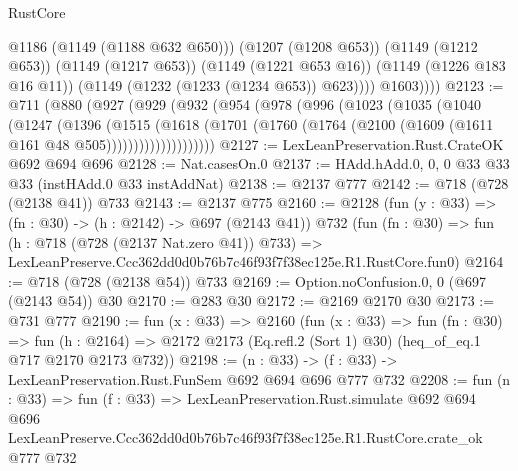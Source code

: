 \begin{lexlean}{RustCore}
\begin{coremodule}
                  @1186
                  (@1149 (@1188 @632 @650)))
                (@1207 (@1208 @653))
                (@1149 (@1212 @653))
                (@1149 (@1217 @653))
                (@1149 (@1221 @653 @16))
                (@1149 (@1226 @183 @16 @11))
                (@1149 (@1232 (@1233 (@1234 @653)) @623))))
            @1603))))
@2123 := @711
    (@880
      (@927
        (@929
          (@932
            (@954
              (@978
                (@996
                  (@1023
                    (@1035
                      (@1040
                        (@1247
                          (@1396
                            (@1515
                              (@1618
                                (@1701
                                  (@1760
                                    (@1764 (@2100 (@1609 (@1611 @161 @48 @505))))))))))))))))))))
@2127 := LexLeanPreservation.Rust.CrateOK @692 @694 @696
@2128 := Nat.casesOn.{0}
@2137 := HAdd.hAdd.{0, 0, 0} @33 @33 @33 (instHAdd.{0} @33 instAddNat)
@2138 := @2137 @777
@2142 := @718 (@728 (@2138 @41)) @733
@2143 := @2137 @775
@2160 := @2128
    (fun (y : @33) => (fn : @30) -> (h : @2142) -> @697 (@2143 @41))
    @732
    (fun (fn : @30) =>
    fun (h : @718 (@728 (@2137 Nat.zero @41)) @733) =>
    LexLeanPreserve.Ccc362dd0d0b76b7c46f93f7f38ec125e.R1.RustCore.fun0)
@2164 := @718 (@728 (@2138 @54)) @733
@2169 := Option.noConfusion.{0, 0} (@697 (@2143 @54)) @30
@2170 := @283 @30
@2172 := @2169 @2170 @30
@2173 := @731 @777
@2190 := fun (x : @33) =>
  @2160
    (fun (x : @33) =>
    fun (fn : @30) =>
    fun (h : @2164) => @2172 @2173 (Eq.refl.{2} (Sort 1) @30) (heq_of_eq.{1} @717 @2170 @2173 @732))
@2198 := (n : @33) -> (f : @33) -> LexLeanPreservation.Rust.FunSem @692 @694 @696 @777 @732
@2208 := fun (n : @33) =>
  fun (f : @33) =>
  LexLeanPreservation.Rust.simulate
    @692
    @694
    @696
    LexLeanPreserve.Ccc362dd0d0b76b7c46f93f7f38ec125e.R1.RustCore.crate_ok
    @777
    @732
\end{coremodule}
\end{lexlean}
